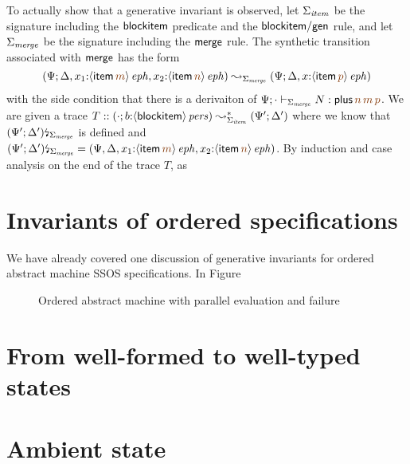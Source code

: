 To actually show that a generative invariant is observed, let
$\Sigma_{\it item}$ be the signature including the ${\sf blockitem}$
predicate and the ${\sf blockitem/gen}$ rule, and let $\Sigma_{\it
  merge}$ be the signature including the ${\sf merge}$ rule. 
The synthetic transition associated with ${\sf merge}$ 
has the form 
\[
(\Psi; \Delta, x_1{:}\iseph{\susp{{\sf item}\,\lf{m}}},
          x_2{:}\iseph{\susp{{\sf item}\,\lf{n}}}) 
\leadsto_{\Sigma_{\it merge}} 
 (\Psi; \Delta, x{:}\iseph{\susp{{\sf item}\,\lf{p}}})\]
with the side condition that there is a derivaiton
of $\Psi; \cdot \vdash_{\Sigma_{\it merge}} N : 
    {\sf plus}\,\lf{n}\,\lf{m}\,\lf{p}$. 
We are given a trace
$T :: (\cdot; b{:}{\langle {{\sf blockitem}} \rangle}\,{{\it pers}}) \leadsto^*_{\Sigma_{\it item}}
     (\Psi'; \Delta')$ where we know that
${(\Psi'; \Delta')}{\mbox{\lightning}}_{\Sigma_{\it merge}}$ is defined and
$\restrictsig{(\Psi'; \Delta')}{\Sigma_{\it merge}} = 
 (\Psi, \Delta, x_1{:}\iseph{\susp{{\sf item}\,\lf{m}}},
          x_2{:}\iseph{\susp{{\sf item}\,\lf{n}}})$. By induction
and case analysis on the end of the trace $T$, as 


\section{Invariants of ordered specifications}

We have already covered one discussion of generative invariants for 
ordered abstract machine SSOS specifications. In Figure 

\begin{figure}[tp]
\caption{Ordered abstract machine with parallel evaluation and failure}
\label{fig:ssos-fail}
\end{figure}


\section{From well-formed to well-typed states}

\section{Ambient state}



